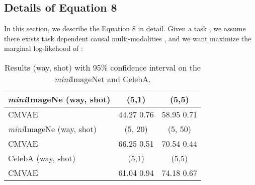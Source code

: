 \documentclass[letterpaper]{article} \usepackage{aaai23}  \usepackage{times}  \usepackage{helvet}  \usepackage{courier}  \usepackage[hyphens]{url}  \usepackage{graphicx} \urlstyle{rm} \def\UrlFont{\rm}  \usepackage{natbib}  \usepackage{caption} \frenchspacing  \setlength{\pdfpagewidth}{8.5in}  \setlength{\pdfpageheight}{11in}  \usepackage{algorithm}
\theoremstyle{plain}
\theoremstyle{definition}
\theoremstyle{remark}
\begin{document}
\subsection{Details of Equation 8} \label{app:elbo}
In this section, we describe the Equation 8 in detail. Given a task , we assume there exists task dependent causal multi-modalities , and we want maximize the marginal log-likehood of  :
\begin{small}
	
\end{small}

\begin{table}[]
	\centering
	\caption{Results (way, shot) with 95\% confidence interval on the \textit{mini}ImageNet and CelebA.}  
	\label{tab:app_res_mini}
	\begin{tabular}{lcc}
		\hline
		\textit{mini}ImageNe (way, shot) &       (5,1)       &       (5,5)       \\ \hline
		\rowcolor{gray!20}  CMVAE                            & 44.27  0.76  & 58.95  0.71  \\ \hline
		\textit{mini}ImageNe (way, shot) &      (5, 20)      &      (5, 50)     \\ \hline
		\rowcolor{gray!20} 	CMVAE                            & 66.25   0.51 & 70.54   0.44 \\ \hline
		CelebA  (way, shot)  &       (5,1)       &       (5,5)       \\ \hline
		\rowcolor{gray!20}  CMVAE                        & 61.04  0.94  & 74.18  0.67  \\ \hline		                                 
	\end{tabular}
\end{table}
\end{document}
